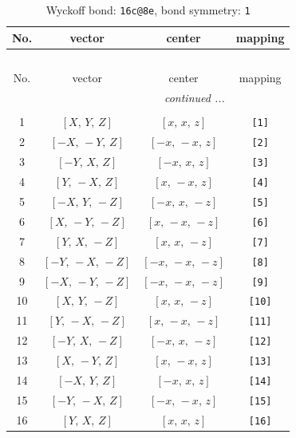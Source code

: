 \documentclass[fleqn,8pt]{jsarticle}
\begin{document}
\begin{longtable}{cccc}
\caption{Wyckoff bond: {\tt 16c@8e}, bond symmetry: {\tt 1}}
 \\
 \hline \hline
No. & vector & center & mapping \\ \hline \endfirsthead

\multicolumn{3}{l}{\tablename\ \thetable{}} \\
 \hline \hline
No. & vector & center & mapping \\ \hline \endhead

 \hline \hline
\multicolumn{3}{r}{\footnotesize\it continued ...} \\ \endfoot

 \hline \hline
\multicolumn{3}{r}{} \\ \endlastfoot

1 & $\left[ X,\, Y,\, Z \right]$ & $\left[ x,\, x,\, z \right]$ & {\tt [1]} \\ \hline
2 & $\left[ - X,\, - Y,\, Z \right]$ & $\left[ - x,\, - x,\, z \right]$ & {\tt [2]} \\ \hline
3 & $\left[ - Y,\, X,\, Z \right]$ & $\left[ - x,\, x,\, z \right]$ & {\tt [3]} \\ \hline
4 & $\left[ Y,\, - X,\, Z \right]$ & $\left[ x,\, - x,\, z \right]$ & {\tt [4]} \\ \hline
5 & $\left[ - X,\, Y,\, - Z \right]$ & $\left[ - x,\, x,\, - z \right]$ & {\tt [5]} \\ \hline
6 & $\left[ X,\, - Y,\, - Z \right]$ & $\left[ x,\, - x,\, - z \right]$ & {\tt [6]} \\ \hline
7 & $\left[ Y,\, X,\, - Z \right]$ & $\left[ x,\, x,\, - z \right]$ & {\tt [7]} \\ \hline
8 & $\left[ - Y,\, - X,\, - Z \right]$ & $\left[ - x,\, - x,\, - z \right]$ & {\tt [8]} \\ \hline
9 & $\left[ - X,\, - Y,\, - Z \right]$ & $\left[ - x,\, - x,\, - z \right]$ & {\tt [9]} \\ \hline
10 & $\left[ X,\, Y,\, - Z \right]$ & $\left[ x,\, x,\, - z \right]$ & {\tt [10]} \\ \hline
11 & $\left[ Y,\, - X,\, - Z \right]$ & $\left[ x,\, - x,\, - z \right]$ & {\tt [11]} \\ \hline
12 & $\left[ - Y,\, X,\, - Z \right]$ & $\left[ - x,\, x,\, - z \right]$ & {\tt [12]} \\ \hline
13 & $\left[ X,\, - Y,\, Z \right]$ & $\left[ x,\, - x,\, z \right]$ & {\tt [13]} \\ \hline
14 & $\left[ - X,\, Y,\, Z \right]$ & $\left[ - x,\, x,\, z \right]$ & {\tt [14]} \\ \hline
15 & $\left[ - Y,\, - X,\, Z \right]$ & $\left[ - x,\, - x,\, z \right]$ & {\tt [15]} \\ \hline
16 & $\left[ Y,\, X,\, Z \right]$ & $\left[ x,\, x,\, z \right]$ & {\tt [16]} \\
\end{longtable}
\end{document}
